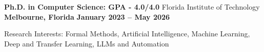 


\begin{cventries}

\cventry
{\textbf{Ph.D. in Computer Science: GPA - 4.0/4.0}}
{Florida Institute of Technology}
{\textbf{Melbourne, Florida}}
{\textbf{January 2023 – May 2026}}
{
\begin{cvitems}
\item {Research Interests: Formal Methods, Artificial Intelligence, Machine Learning, Deep and Transfer Learning, LLMs and Automation}

\end{cvitems}}
\end{cventries}
